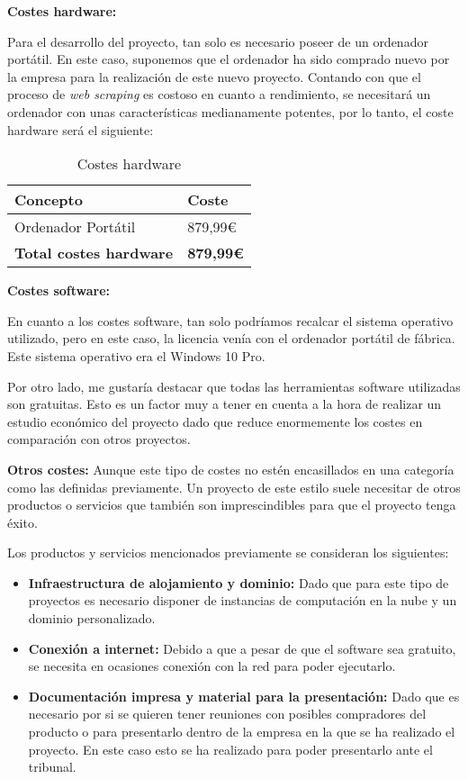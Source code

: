 \newpage

\textbf{Costes hardware:}

Para el desarrollo del proyecto, tan solo es necesario poseer de un ordenador portátil. En este caso, suponemos que el ordenador ha sido comprado nuevo por la empresa para la realización de este nuevo proyecto. Contando con que el proceso de \textit{web scraping} es costoso en cuanto a rendimiento, se necesitará un ordenador con unas características medianamente potentes, por lo tanto, el coste hardware será el siguiente:

\begin{table}[H]
    \centering
    \renewcommand{\arraystretch}{1.2}
    \setlength{\tabcolsep}{20pt}
    \begin{tabular}{l l}
        \hline
        \textbf{Concepto} & \textbf{Coste} \\ \hline
        Ordenador Portátil & 879,99€ \\  \hline
        \textbf{Total costes hardware} & \textbf{879,99€}\\ \hline
    \end{tabular}
    \caption{Costes hardware}
    \label{tab:costes_hardware}
\end{table}

\textbf{Costes software:}

En cuanto a los costes software, tan solo podríamos recalcar el sistema operativo utilizado, pero en este caso, la licencia venía con el ordenador portátil de fábrica. Este sistema operativo era el Windows 10 Pro.

Por otro lado, me gustaría destacar que todas las herramientas software utilizadas son gratuitas. Esto es un factor muy a tener en cuenta a la hora de realizar un estudio económico del proyecto dado que reduce enormemente los costes en comparación con otros proyectos.

\textbf{Otros costes:}
Aunque este tipo de costes no estén encasillados en una categoría como las definidas previamente. Un proyecto de este estilo suele necesitar de otros productos o servicios que también son imprescindibles para que el proyecto tenga éxito.  

Los productos y servicios mencionados previamente se consideran los siguientes:

\begin{itemize}
\item \textbf{Infraestructura de alojamiento y dominio: } Dado que para este tipo de proyectos es necesario disponer de instancias de computación en la nube y un dominio personalizado.
\item \textbf{Conexión a internet: } Debido a que a pesar de que el software sea gratuito, se necesita en ocasiones conexión con la red para poder ejecutarlo.
\item \textbf{Documentación impresa y material para la presentación: } Dado que es necesario por si se quieren tener reuniones con posibles compradores del producto o para presentarlo dentro de la empresa en la que se ha realizado el proyecto. En este caso esto se ha realizado para poder presentarlo ante el tribunal.

\end{itemize}

